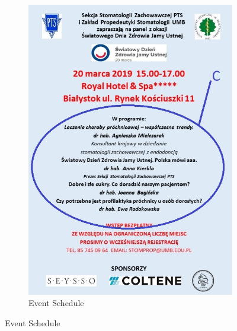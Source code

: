 \documentclass[a4paper,11pt,oneside]{scrreprt}
\begin{document}
\begin{figure}[H]
\begin{subfigure}{.5\textwidth}
		\includegraphics[clip, trim=0cm 0cm 0cm 0cm, scale=0.53]{./images/proximity.jpg}
		\caption{Event Schedule}
	\end{subfigure}
\end{figure}
\end{document}
